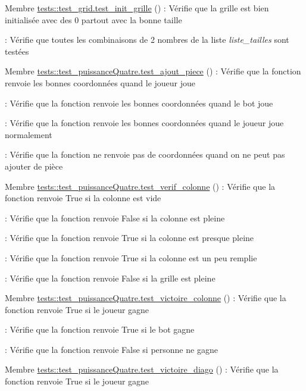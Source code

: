 
\begin{DoxyRefList}
\item[Membre \mbox{\hyperlink{namespacetests_1_1test__grid_a7520f5c548106e9c3b0250d987577c3f}{tests\+::test\+\_\+grid.test\+\_\+init\+\_\+grille}} ()]\label{test__test000001}%
%
\+: Vérifie que la grille est bien initialisée avec des 0 partout avec la bonne taille 

\+: Vérifie que toutes les combinaisons de 2 nombres de la liste {\itshape liste\+\_\+tailles} sont testées 
\item[Membre \mbox{\hyperlink{namespacetests_1_1test__puissanceQuatre_af5070e55f86c1578a98ee3a7af424587}{tests\+::test\+\_\+puissance\+Quatre.test\+\_\+ajout\+\_\+piece}} ()]\label{test__test000003}%
%
\+: Vérifie que la fonction renvoie les bonnes coordonnées quand le joueur joue 

\+: Vérifie que la fonction renvoie les bonnes coordonnées quand le bot joue 

\+: Vérifie que la fonction renvoie les bonnes coordonnées quand le joueur joue normalement 

\+: Vérifie que la fonction ne renvoie pas de coordonnées quand on ne peut pas ajouter de pièce 
\item[Membre \mbox{\hyperlink{namespacetests_1_1test__puissanceQuatre_a5334253573b649c8f36f3af1380b41a3}{tests\+::test\+\_\+puissance\+Quatre.test\+\_\+verif\+\_\+colonne}} ()]\label{test__test000002}%
%
\+: Vérifie que la fonction renvoie True si la colonne est vide 

\+: Vérifie que la fonction renvoie False si la colonne est pleine 

\+: Vérifie que la fonction renvoie True si la colonne est presque pleine 

\+: Vérifie que la fonction renvoie True si la colonne est un peu remplie 

\+: Vérifie que la fonction renvoie False si la grille est pleine 
\item[Membre \mbox{\hyperlink{namespacetests_1_1test__puissanceQuatre_a1d9fe9633e808ac195d30c477c5ba726}{tests\+::test\+\_\+puissance\+Quatre.test\+\_\+victoire\+\_\+colonne}} ()]\label{test__test000005}%
%
\+: Vérifie que la fonction renvoie True si le joueur gagne 

\+: Vérifie que la fonction renvoie True si le bot gagne 

\+: Vérifie que la fonction renvoie False si personne ne gagne 
\item[Membre \mbox{\hyperlink{namespacetests_1_1test__puissanceQuatre_a3f45d827e4e515ce405870f9e6e60d7e}{tests\+::test\+\_\+puissance\+Quatre.test\+\_\+victoire\+\_\+diago}} ()]\label{test__test000006}%
%
\+: Vérifie que la fonction renvoie True si le joueur gagne 


\end{DoxyRefList}
